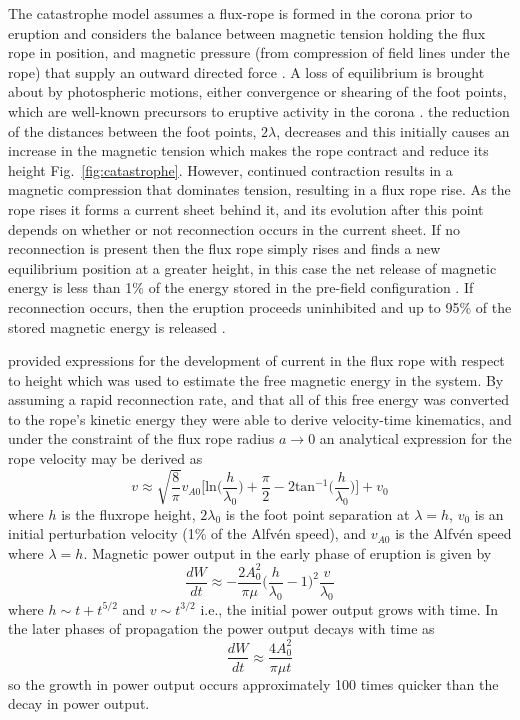 The catastrophe model assumes a flux-rope is formed in the corona prior to eruption and considers the balance between magnetic tension holding the flux rope in position, and magnetic pressure (from compression of field lines under the rope) that supply an outward directed force \citep{forbes1991, lin2000, priest2000}. A loss of equilibrium is brought about by photospheric motions, either convergence or shearing of the foot points, which are well-known precursors to eruptive activity in the corona \citep{rust1972}. the reduction of the distances between the foot points, $2\lambda$, decreases and this initially 
causes an increase in the magnetic tension which makes the rope contract and reduce its height Fig.~\ref{fig:catastrophe}. However, continued contraction results in a magnetic compression that  dominates tension, resulting in a flux rope rise. As the rope rises it forms a current sheet behind it, and its evolution after this point depends on whether or not reconnection occurs in the current sheet. If no reconnection is present then the flux rope simply rises and finds a new equilibrium position at a greater height, in this case the net release of magnetic energy is less than 1\% of the energy stored in the pre-field configuration \citep{forbes1991}. If reconnection occurs, then the eruption proceeds uninhibited and up to 95\% of the stored magnetic energy is released \citep{forbes1995}.

\citet{forbes1995} provided expressions for the development of current in the flux rope with respect to height which was used to estimate the free magnetic energy in the system. By assuming a rapid reconnection rate, and that all of this free energy was converted to the rope's kinetic energy they were able to derive velocity-time kinematics, and under the constraint of the flux rope radius $a\rightarrow 0$ an analytical expression for the rope velocity may be derived as \citep{priest2000}
\begin{equation}
v\approx \sqrt{  \frac{8}{\pi}  }v_{A0}\bigg[\mathrm{ln}\bigg( \frac{h}{\lambda_0}\bigg) + \frac{\pi}{2}  - 2\mathrm{tan}^{-1} \bigg( \frac{h}{\lambda_0}\bigg)\bigg] + v_0
\end{equation}
where $h$ is the fluxrope height, $2\lambda_0$ is the foot point separation at $\lambda=h$, $v_0$ is an initial perturbation velocity (1\% of the Alfv\'{e}n speed), and $v_{A0}$ is the Alfv\'{e}n speed where $\lambda=h$. Magnetic power output in the early phase of eruption is given by
\begin{equation}
\frac{dW}{dt} \approx -\frac{2A_0^2}{\pi\mu}\bigg( \frac{h}{\lambda_0} -1\bigg)^2\frac{v}{\lambda_0}
\end{equation}
where $h\sim t + t^{5/2}$ and $v\sim t^{3/2}$ i.e., the initial power output grows with time. In the later phases of propagation the power output decays with time as
\begin{equation}
\frac{dW}{dt} \approx \frac{4A_0^2}{\pi \mu t}
\end{equation}
so the growth in power output occurs approximately 100 times quicker than the decay in power output.

